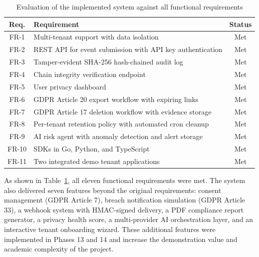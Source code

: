 \documentclass[a4paper,12pt,onecolumn]{report}
\begin{document}
\begin{table}[h]
    \begin{center}
        \begin{tabular}{|c|p{9cm}|c|}
            \hline
            \textbf{Req.} & \textbf{Requirement} & \textbf{Status} \\
            \hline
            FR-1 & Multi-tenant support with data isolation & Met \\
            \hline
            FR-2 & REST API for event submission with API key authentication & Met \\
            \hline
            FR-3 & Tamper-evident SHA-256 hash-chained audit log & Met \\
            \hline
            FR-4 & Chain integrity verification endpoint & Met \\
            \hline
            FR-5 & User privacy dashboard & Met \\
            \hline
            FR-6 & GDPR Article 20 export workflow with expiring links & Met \\
            \hline
            FR-7 & GDPR Article 17 deletion workflow with evidence storage & Met \\
            \hline
            FR-8 & Per-tenant retention policy with automated cron cleanup & Met \\
            \hline
            FR-9 & AI risk agent with anomaly detection and alert storage & Met \\
            \hline
            FR-10 & SDKs in Go, Python, and TypeScript & Met \\
            \hline
            FR-11 & Two integrated demo tenant applications & Met \\
            \hline
        \end{tabular}
    \end{center}
    \caption{Evaluation of the implemented system against all functional requirements}
    \label{tab:requirements-eval}
\end{table}

As shown in Table~\ref{tab:requirements-eval}, all eleven functional requirements were met.
The system also delivered seven features beyond the original requirements: consent management (GDPR Article 7), breach notification simulation (GDPR Article 33), a webhook system with HMAC-signed delivery, a PDF compliance report generator, a privacy health score, a multi-provider AI orchestration layer, and an interactive tenant onboarding wizard.
These additional features were implemented in Phases 13 and 14 and increase the demonstration value and academic complexity of the project.
\end{document}
